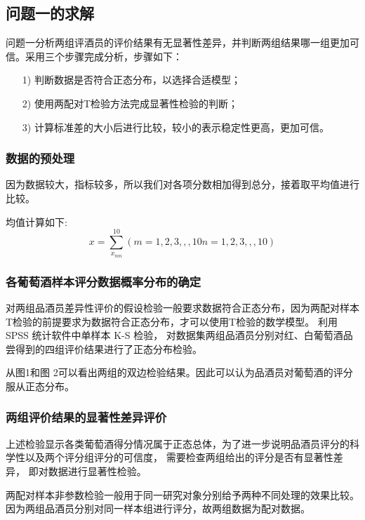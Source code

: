 \documentclass[UTF8]{ctexart}
\begin{document}
		\subsection{问题一的求解}
		问题一分析两组评酒员的评价结果有无显著性差异，并判断两组结果哪一组更加可信。采用三个步骤完成分析，步骤如下：
		\begin{itemize}
			\item [{1)}]{判断数据是否符合正态分布，以选择合适模型；}
			\item [2)]{使用两配对T检验方法完成显著性检验的判断；}
			\item [3)]{计算标准差的大小后进行比较，较小的表示稳定性更高，更加可信。}
	
		\end{itemize}
		
		\subsubsection{数据的预处理}
			因为数据较大，指标较多，所以我们对各项分数相加得到总分，接着取平均值进行比较。

			均值计算如下:
			\begin{equation}
				x = \sum_{x_{mn}}^{10}(m = 1,2,3,,,10  n = 1,2,3,,,10)
			\end{equation}

		\subsubsection{各葡萄酒样本评分数据概率分布的确定}
		对两组品酒员差异性评价的假设检验一般要求数据符合正态分布，因为两配对样本T检验的前提要求为数据符合正态分布，才可以使用T检验的数学模型。 
		利用 SPSS 统计软件中单样本 K-S 检验， 对数据集两组品酒员分别对红、白葡萄酒品尝得到的四组评价结果进行了正态分布检验。

		从图1和图 2可以看出两组的双边检验结果。因此可以认为品酒员对葡萄酒的评分服从正态分布。

		\subsubsection{两组评价结果的显著性差异评价}
		上述检验显示各类葡萄酒得分情况属于正态总体，为了进一步说明品酒员评分的科学性以及两个评分组评分的可信度， 需要检查两组给出的评分是否有显著性差异， 即对数据进行显著性检验。

		两配对样本非参数检验一般用于同一研究对象分别给予两种不同处理的效果比较。因为两组品酒员分别对同一样本组进行评分，故两组数据为配对数据。
		
\end{document}
